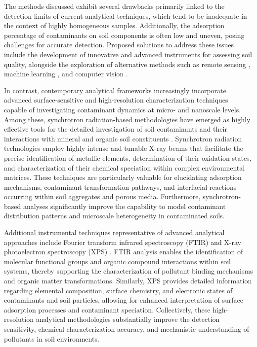 \documentclass[preprint,12pt]{elsarticle}            %
\begin{document}
The methods discussed exhibit several drawbacks primarily linked to the
detection limits of current analytical techniques, which tend to be inadequate
in the context of highly homogeneous samples. Additionally, the adsorption
percentage of contaminants on soil components is often low and uneven, posing
challenges for accurate detection. Proposed solutions to address these issues
include the development of innovative and advanced instruments for assessing
soil quality, alongside the exploration of alternative methods such as remote
sensing \cite{Fan2025,Lemenkova2025b}, machine learning
\cite{Proshad2025,Lemenkova2025d,Lemenkova2024b}, and computer vision
\cite{Fengetal2024}.

In contrast, contemporary analytical frameworks increasingly incorporate
advanced surface-sensitive and high-resolution characterization techniques
capable of investigating contaminant dynamics at micro- and nanoscale levels.
Among these, synchrotron radiation-based methodologies have emerged as highly
effective tools for the detailed investigation of soil contaminants and their
interactions with mineral and organic soil constituents
\cite{Hu2020,Rosskopfova2012,LindhLemenkova2023a}. Synchrotron radiation
technologies employ highly intense and tunable X-ray beams that facilitate
the precise identification of metallic elements, determination of their
oxidation states, and characterization of their chemical speciation within
complex environmental matrices. These techniques are particularly valuable for
elucidating adsorption mechanisms, contaminant transformation pathways, and
interfacial reactions occurring within soil aggregates and porous media.
Furthermore, synchrotron-based analyses significantly improve the capability
to model contaminant distribution patterns and microscale heterogeneity in
contaminated soils.

Additional instrumental techniques representative of advanced analytical
approaches include Fourier transform infrared spectroscopy (FTIR)
\cite{Xu2026} and X-ray photoelectron spectroscopy (XPS)
\cite{Guo2025,LindhLemenkova2023c}. FTIR analysis enables the identification
of molecular functional groups and organic compound interactions within soil
systems, thereby supporting the characterization of pollutant binding
mechanisms and organic matter transformations. Similarly, XPS provides
detailed information regarding elemental composition, surface chemistry, and
electronic states of contaminants and soil particles, allowing for enhanced
interpretation of surface adsorption processes and contaminant speciation.
Collectively, these high-resolution analytical methodologies substantially
improve the detection sensitivity, chemical characterization accuracy, and
mechanistic understanding of pollutants in soil environments.
\end{document}
